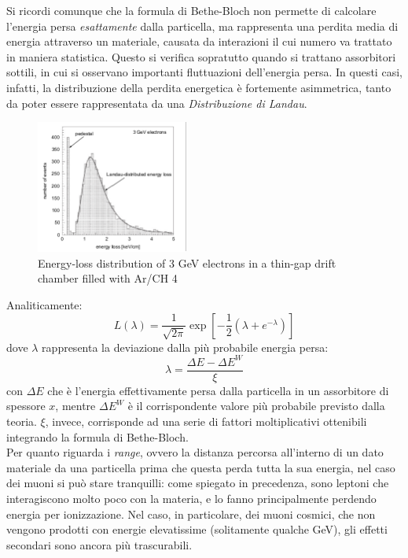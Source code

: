 \documentclass[a4paper,11pt]{book}
\begin{document}
Si ricordi comunque che la formula di Bethe-Bloch non permette di calcolare l'energia persa \textit{esattamente} dalla particella, ma rappresenta una perdita media di energia attraverso un materiale, causata da interazioni il cui numero va trattato in maniera statistica. Questo si verifica sopratutto quando si trattano assorbitori sottili, in cui si osservano importanti fluttuazioni dell'energia persa. In questi casi, infatti, la distribuzione della perdita energetica è fortemente asimmetrica, tanto da poter essere rappresentata da una \textit{Distribuzione di Landau}.\\
\begin{figure}
\label{fig:landau_distribution}
\includegraphics[width=5cm]{pictures/landau.pdf}
\caption{Energy-loss distribution of 3 GeV electrons in a thin-gap drift chamber
filled with Ar/CH 4}
\end{figure}
 Analiticamente:
\begin{equation}
\label{eq:landau}
L(\lambda) = \frac{1}{\sqrt{2\pi}}\exp\left[-\frac{1}{2}(\lambda+e^{-\lambda})\right]
\end{equation}
dove $\lambda$ rappresenta la deviazione dalla più probabile energia persa:
\[ \lambda = \frac{\Delta E - \Delta E^W}{\xi} \]
con $\Delta E$ che è l'energia effettivamente persa dalla particella in un assorbitore di spessore $x$, mentre $\Delta E^W$ è il corrispondente valore più probabile previsto dalla teoria. $\xi$, invece, corrisponde ad una serie di fattori moltiplicativi ottenibili integrando la formula di Bethe-Bloch.\\

\bigskip
Per quanto riguarda i \textit{range}, ovvero la distanza percorsa all'interno di un dato materiale da una particella prima che questa perda tutta la sua energia, nel caso dei muoni si può stare tranquilli: come spiegato in precedenza, sono leptoni che interagiscono molto poco con la materia, e lo fanno principalmente perdendo energia per ionizzazione. Nel caso, in particolare, dei muoni cosmici, che non vengono prodotti con energie elevatissime (solitamente qualche GeV), gli effetti secondari sono ancora più trascurabili.
\end{document}
